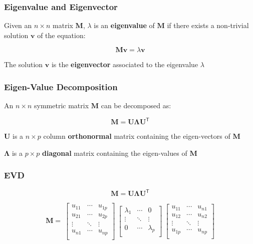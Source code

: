 \documentclass[12pt]{beamer}\usepackage[]{graphicx}\usepackage[]{color}
\begin{document}
  
\begin{frame}
\frametitle{Eigenvalue and Eigenvector}

Given an $n \times n$ matrix $\mathbf{M}$, $\lambda$ is an \textbf{eigenvalue}
of $\mathbf{M}$ if there exists a non-trivial solution $\mathbf{v}$ of the
equation:

$$
\mathbf{M v} = \lambda \mathbf{v}
$$

The solution $\mathbf{v}$ is the \textbf{eigenvector} associated to the
eigenvalue $\lambda$

\end{frame}

  
\begin{frame}
\frametitle{Eigen-Value Decomposition}

An $n \times n$ {\hilit symmetric matrix} $\mathbf{M}$ can be decomposed as:

$$
\mathbf{M = U \Lambda U^\mathsf{T}}
$$
\eb

\bi
 \item $\mathbf{U}$ is a $n \times p$ column \textbf{orthonormal} matrix containing the eigen-vectors of $\mathbf{M}$
 \item $\mathbf{\Lambda}$ is a $p \times p$ \textbf{diagonal} matrix containing the eigen-values of $\mathbf{M}$
\ei
\eb

\end{frame}


\begin{frame}
\frametitle{EVD}

$$
\mathbf{M = U \Lambda U^\mathsf{T}}
$$

$$
\mathbf{M} = 
\
\begin{bmatrix} 
u_{11} & \cdots & u_{1p} \\
u_{21} & \cdots & u_{2p} \\
\vdots & \ddots & \vdots \\
u_{n1} & \cdots & u_{np} \\
\end{bmatrix}
\
\begin{bmatrix} 
\lambda_1 & \cdots & 0 \\ 
\vdots & \ddots & \vdots \\
0 & \cdots & \lambda_p \\
\end{bmatrix}
\
\begin{bmatrix} 
u_{11} & \cdots & u_{n1} \\
u_{12} & \cdots & u_{n2} \\
\vdots & \ddots & \vdots \\
u_{1p} & \cdots & u_{np} \\
\end{bmatrix}
$$

\end{frame}
\end{document}
